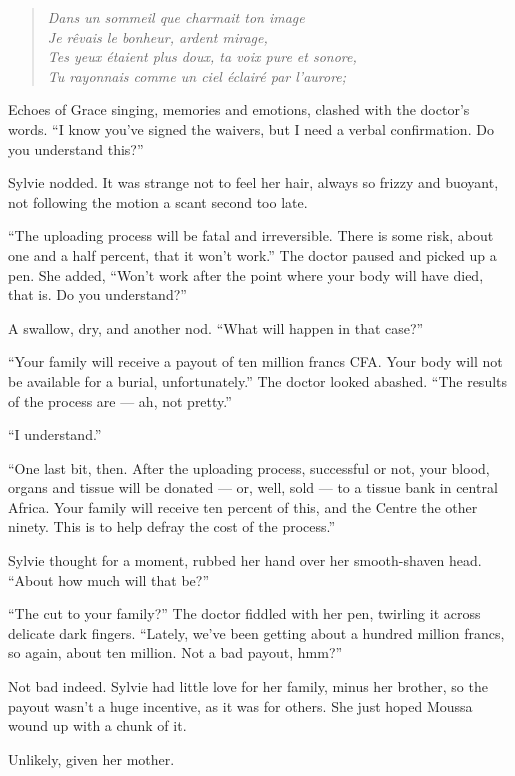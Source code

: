 \begin{quote}
\emph{Dans un sommeil que charmait ton image\\
Je rêvais le bonheur, ardent mirage,\\
Tes yeux étaient plus doux, ta voix pure et sonore,\\
Tu rayonnais comme un ciel éclairé par l'aurore;}
\end{quote}

Echoes of Grace singing, memories and emotions, clashed with the doctor's words. ``I know you've signed the waivers, but I need a verbal confirmation. Do you understand this?''

Sylvie nodded. It was strange not to feel her hair, always so frizzy and buoyant, not following the motion a scant second too late.

``The uploading process will be fatal and irreversible. There is some risk, about one and a half percent, that it won't work.'' The doctor paused and picked up a pen. She added, ``Won't work after the point where your body will have died, that is. Do you understand?''

A swallow, dry, and another nod. ``What will happen in that case?''

``Your family will receive a payout of ten million francs CFA. Your body will not be available for a burial, unfortunately.'' The doctor looked abashed. ``The results of the process are --- ah, not pretty.''

``I understand.''

``One last bit, then. After the uploading process, successful or not, your blood, organs and tissue will be donated --- or, well, sold --- to a tissue bank in central Africa. Your family will receive ten percent of this, and the Centre the other ninety. This is to help defray the cost of the process.''

Sylvie thought for a moment, rubbed her hand over her smooth-shaven head. ``About how much will that be?''

``The cut to your family?'' The doctor fiddled with her pen, twirling it across delicate dark fingers. ``Lately, we've been getting about a hundred million francs, so again, about ten million. Not a bad payout, hmm?''

Not bad indeed. Sylvie had little love for her family, minus her brother, so the payout wasn't a huge incentive, as it was for others. She just hoped Moussa wound up with a chunk of it.

Unlikely, given her mother.


